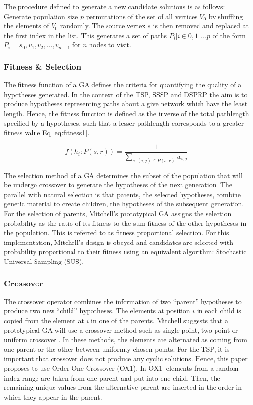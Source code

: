 \documentclass[
	a4paper, %
	10pt, %
	unnumberedsections, %
	twoside, %
]{LTJournalArticle}
\begin{document}
The procedure defined to generate a new candidate solutions is as follows: Generate population size \(p\) permutations of the set of all vertices \(V_{0}\) by shuffling the elements of \(V_{0}\) randomly. The source vertex \(s\) is then removed and replaced at the first index in the list. This generates a set of paths \({P_{i} | i \in {0, 1, ... p}}\) of the form \(P_{i} = {s_{0}, v_{1}, v_{2}, ..., v_{n-1}}\) for \(n\) nodes to visit. \\

\subsubsection{Fitness \& Selection} 
The fitness function of a GA defines the criteria for quantifying the quality of a hypotheses generated. In the context of the TSP, SSSP and DSPRP the aim is to produce hypotheses representing paths about a give network which have the least length. Hence, the fitness function is defined as the inverse of the total pathlength specified by a hypotheses, such that a lesser pathlength corresponds to a greater fitness value Eq \ref{eq:fitness1}. 

\begin{equation}
	f(h_{i}: P(s, r)) = \frac{1}{\sum_{e: (i, j) \in P(s, r)} w_{i, j}}
	\label{eq:fitness1}
\end{equation}

The selection method of a GA determines the subset of the population that will be undergo crossover to generate the hypotheses of the next generation. The parallel with natural selection is that parents, the selected hypotheses, combine genetic material to create children, the hypotheses of the subsequent generation. For the selection of parents, Mitchell's prototypical GA assigns the   selection probability as the ratio of its fitness to the sum fitness of the other hypotheses in the population. This is referred to as fitness proportional selection. For this implementation, Mitchell's design is obeyed and candidates are selected with probability proportional to their fitness using an equivalent algorithm: Stochastic Universal Sampling (SUS). 

\subsubsection{Crossover} 
The crossover operator combines the information of two ``parent'' hypotheses to produce two new ``child'' hypotheses. The elements at position \(i\) in each child is copied from the element at \(i\) in one of the parents. Mitchell suggests that a prototypical GA will use a crossover method such as single point, two point  or uniform crossover \cite{mitchell:97}. In these methods, the elements are alternated as coming from one parent or the other between uniformly chosen points. For the TSP, it is important that crossover does not produce any cyclic solutions. Hence, this paper proposes to use Order One Crossover (OX1). In OX1, elements from a random index range are taken from one parent and put into one child. Then, the remaining unique values from the alternative parent are inserted in the order in which they appear in the parent. 
\end{document}
